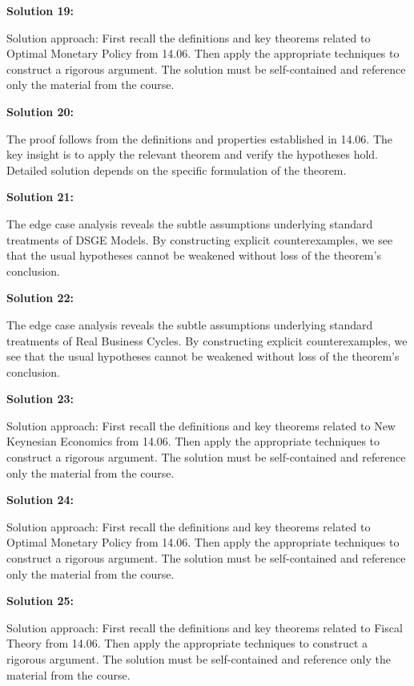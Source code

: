\documentclass[12pt,a4paper]{exam}
\begin{document}
\vspace{0.5cm}

\textbf{Solution 19:}

Solution approach: First recall the definitions and key theorems related to Optimal Monetary Policy from 14.06. Then apply the appropriate techniques to construct a rigorous argument. The solution must be self-contained and reference only the material from the course.

\vspace{0.5cm}

\textbf{Solution 20:}

The proof follows from the definitions and properties established in 14.06. The key insight is to apply the relevant theorem and verify the hypotheses hold. Detailed solution depends on the specific formulation of the theorem.

\vspace{0.5cm}

\textbf{Solution 21:}

The edge case analysis reveals the subtle assumptions underlying standard treatments of DSGE Models. By constructing explicit counterexamples, we see that the usual hypotheses cannot be weakened without loss of the theorem's conclusion.

\vspace{0.5cm}

\textbf{Solution 22:}

The edge case analysis reveals the subtle assumptions underlying standard treatments of Real Business Cycles. By constructing explicit counterexamples, we see that the usual hypotheses cannot be weakened without loss of the theorem's conclusion.

\vspace{0.5cm}

\textbf{Solution 23:}

Solution approach: First recall the definitions and key theorems related to New Keynesian Economics from 14.06. Then apply the appropriate techniques to construct a rigorous argument. The solution must be self-contained and reference only the material from the course.

\vspace{0.5cm}

\textbf{Solution 24:}

Solution approach: First recall the definitions and key theorems related to Optimal Monetary Policy from 14.06. Then apply the appropriate techniques to construct a rigorous argument. The solution must be self-contained and reference only the material from the course.

\vspace{0.5cm}

\textbf{Solution 25:}

Solution approach: First recall the definitions and key theorems related to Fiscal Theory from 14.06. Then apply the appropriate techniques to construct a rigorous argument. The solution must be self-contained and reference only the material from the course.

\vspace{0.5cm}
\end{document}
